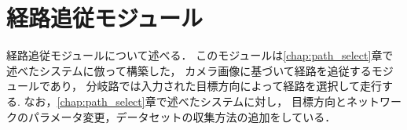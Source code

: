 \section{経路追従モジュール}
\label{sec:imitation}
経路追従モジュールについて述べる．
このモジュールは\ref{chap:path_select}章で述べたシステムに倣って構築した，
カメラ画像に基づいて経路を追従するモジュールであり，
分岐路では入力された目標方向によって経路を選択して走行する.
なお，\ref{chap:path_select}章で述べたシステムに対し，
目標方向とネットワークのパラメータ変更，データセットの収集方法の追加をしている．





